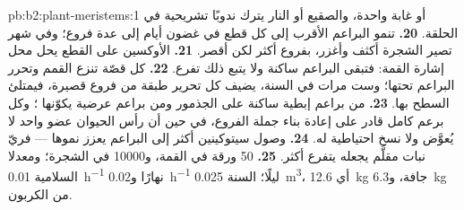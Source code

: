 \begin{solution}{pb:b2:plant-meristems:1}
أو غابة واحدة، والصقيع أو النار يترك ندوبًا تشريحية في الحلقة.
\textbf{20.} تنمو البراعم الأقرب إلى كل قطع في غضون أيام إلى
عدة فروع؛ وفي شهر تصير الشجرة أكثف وأغزر، بفروع أكثر
لكن أقصر.
\textbf{21.} الأوكسين على القطع يحل محل إشارة القمة: فتبقى البراعم
ساكنة ولا يتبع ذلك تفرع.
\textbf{22.} كل قصّة تنزع القمم وتحرر البراعم
تحتها؛ وست مرات في السنة، يضيف كل تحرير طبقة من فروع قصيرة،
فيمتلئ السطح بها.
\textbf{23.} من براعم إبطية ساكنة على الجذمور ومن براعم عرضية
يكوّنها ؛ وكل برعم  كامل قادر
على إعادة بناء جملة الفروع، في حين أن رأس الحيوان عضو
 واحد لا يُعوَّض ولا نسخ احتياطية له.
\textbf{24.} وصول سيتوكينين أكثر إلى البراعم يعزز نموها
--- فريّ نبات مقلَّم يجعله يتفرع أكثر.
\textbf{25.} 50 ورقة في القمة، و\num{10000} في الشجرة؛ ومعدلا السلامية
\qty{0.01}{h^{-1}} نهارًا و\qty{0.02}{h^{-1}} ليلًا؛  السنة
\qty{0.025}{m^3}، أي \qty{12.6}{kg} جافة، و\qty{6.3}{kg} من الكربون.
\end{solution}
